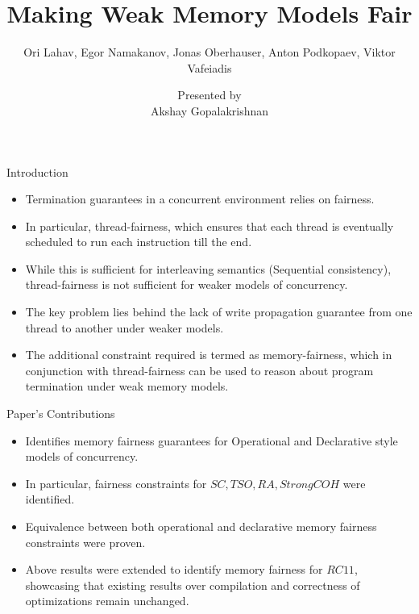 \documentclass[dvipsnames, notes]{beamer}
\title{Making Weak Memory Models Fair}
\subtitle{Ori Lahav, Egor Namakanov, Jonas Oberhauser, Anton Podkopaev, Viktor Vafeiadis}
\author{Presented by \\ Akshay Gopalakrishnan}
\begin{document}
    \begin{frame}

        \maketitle

    \end{frame}

    \begin{frame}{Introduction}

      \begin{itemize}
        \item Termination guarantees in a concurrent environment relies on fairness.
        \item In particular, thread-fairness, which ensures that each thread is eventually scheduled to run each instruction till the end.
        \item While this is sufficient for interleaving semantics (Sequential consistency), thread-fairness is not sufficient for weaker models of concurrency. 
        \item The key problem lies behind the lack of write propagation guarantee from one thread to another under weaker models.
        \item The additional constraint required is termed as memory-fairness, which in conjunction with thread-fairness can be used to reason about program termination under weak memory models.
      \end{itemize}
      
    \end{frame}

    \begin{frame}{Paper's Contributions}

      \begin{itemize}
        \item Identifies memory fairness guarantees for Operational and Declarative style models of concurrency.
        \item In particular, fairness constraints for $SC, TSO, RA, StrongCOH$ were identified.
        \item Equivalence between both operational and declarative memory fairness constraints were proven. 
        \item Above results were extended to identify memory fairness for $RC11$, showcasing that existing results over compilation and correctness of optimizations remain unchanged.
      \end{itemize}
      
    \end{frame}
\end{document}
